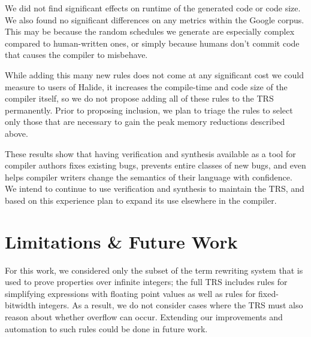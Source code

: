 \documentclass[acmsmall,review]{acmart}\settopmatter{printfolios=true,printccs=false,printacmref=false}
\newcommand{\hmax}[0]{\texttt{max}}
\newcommand{\hmin}[0]{\texttt{min}}
\newcommand{\rewrites}[0]{\:\rightarrow_{R}\:}
\begin{document}
We did not find significant effects on runtime of the generated code or code size. We also found no significant differences on any metrics within the Google corpus. This may be because the random schedules we generate are especially complex compared to human-written ones, or simply because humans don't commit code that causes the compiler to misbehave.

While adding this many new rules does not come at any significant cost we could measure to users of Halide, it increases the compile-time and code size of the compiler itself, so we do not propose adding all of these rules to the TRS permanently. Prior to proposing inclusion, we plan to triage the rules to select only those that are necessary to gain the peak memory reductions described above.

These results show that having verification and synthesis available as a tool for compiler authors fixes existing bugs, prevents entire classes of new bugs, and even helps compiler writers change the semantics of their language with confidence. We intend to continue to use verification and synthesis to maintain the TRS, and based on this experience plan to expand its use elsewhere in the compiler.






\section{Limitations \& Future Work}
\label{sec:limitations}
For this work, we considered only the subset of the term rewriting system that
is used to prove properties over infinite integers; the full TRS includes rules
for simplifying expressions with floating point values as well as rules for
fixed-bitwidth integers.  As a result, we do not consider cases where the TRS
must also reason about whether overflow can occur.  Extending our improvements
and automation to such rules could be done in future work.
\end{document}
